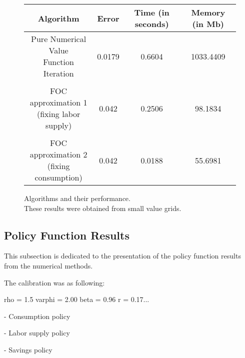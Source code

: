 \documentclass{article}
\begin{document}
\begin{figure}[H]
    \begin{tabular}{cccc}
    \toprule
    Algorithm & Error & Time (in seconds) & Memory (in Mb)\\
    \midrule
    \makecell{Pure Numerical Value \\ Function Iteration} & 0.0179 & 0.6604 & 1033.4409\\
    \\
    \makecell{FOC approximation 1 \\ (fixing labor supply)} & 0.042 & 0.2506 & 98.1834\\
    \\
    \makecell{FOC approximation 2 \\ (fixing consumption)} & 0.042 & 0.0188 & 55.6981\\
    \bottomrule
    \end{tabular}
    \caption{Algorithms and their performance.\\ These results were obtained from small value grids.}
\end{figure}

\subsection{Policy Function Results}

This subsection is dedicated to the presentation of the policy function 
results from the numerical methods. 

The calibration was as following: 

rho = 1.5
varphi = 2.00 
beta = 0.96
r = 0.17...

- Consumption policy 


- Labor supply policy 


- Savings policy
\end{document}
